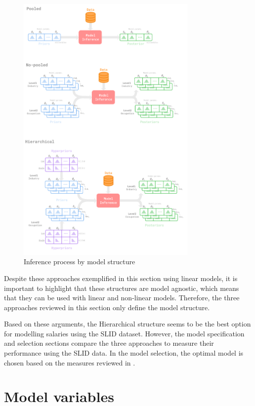 \begin{figure}[H]
    \centering
    \includegraphics[width=0.78\textwidth]{images/ch5_model_structure/model_structure.png}
    \setlength{\abovecaptionskip}{-12pt}
    \caption{Inference process by model structure}
    \label{fig:model_structure}
\end{figure}

Despite these approaches exemplified in this section using linear models, it is important to highlight that these structures are model agnostic, which means that they can be used with linear and non-linear models. Therefore, the three approaches reviewed in this section only define the model structure. 

Based on these arguments, the Hierarchical structure seems to be the best option for modelling salaries using the SLID dataset. However, the model specification and selection sections compare the three approaches to measure their performance using the SLID data. In the model selection, the optimal model is chosen based on the measures reviewed in .

\section{Model variables}


